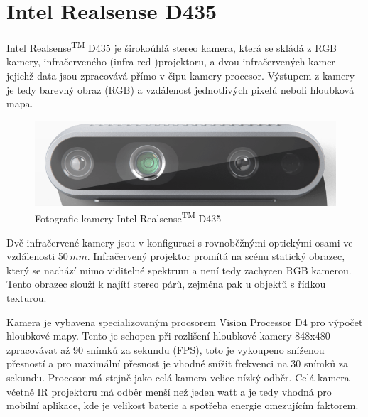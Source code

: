 \documentclass[twoside]{ctuthesis}
\begin{document}
\section{Intel Realsense D435}
Intel\textregistered{} Realsense\textsuperscript{TM} D435 je širokoúhlá stereo kamera, která se skládá z RGB kamery, infračerveného (infra red )projektoru, a dvou infračervených kamer jejichž data jsou zpracovává přímo v čipu kamery procesor. Výstupem z kamery je tedy barevný obraz (RGB) a vzdálenost jednotlivých pixelů neboli hloubková mapa. 

\begin{figure}
    \centering
    \includegraphics[width = 0.8\linewidth]{pictures/realsense_kamera.png}
    \caption{Fotografie kamery Intel\textregistered{} Realsense\textsuperscript{TM} D435 \cite{Realsense_obrazek}}
    \label{Fig:realsense_pic}
\end{figure}

    Dvě infračervené kamery jsou v konfiguraci s rovnoběžnými optickými osami ve vzdálenosti 50$\,mm$. Infračervený projektor promítá na scénu statický obrazec, který se nachází mimo viditelné spektrum a není tedy zachycen RGB kamerou. Tento obrazec slouží k najítí stereo párů, zejména pak u objektů s řídkou texturou.

    Kamera je vybavena specializovaným procsorem Vision Processor D4 pro výpočet hloubkové mapy. Tento je schopen při rozlišení hloubkové kamery 848x480 zpracovávat až 90 snímků za sekundu (FPS), toto je vykoupeno sníženou přesností \cite{keselman2017intel} a pro maximální přesnost je vhodné snížit frekvenci na 30 snímků za sekundu.  Procesor má stejně jako celá kamera velice nízký odběr. Celá kamera včetně IR projektoru má odběr menší než jeden watt a je tedy vhodná pro mobilní aplikace, kde je velikost baterie a spotřeba energie omezujícím faktorem. \cite{RealSense_datasheet}
\end{document}
